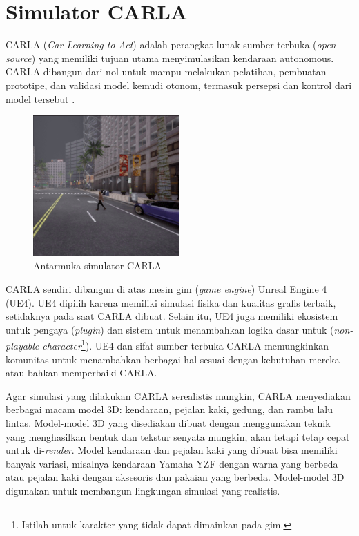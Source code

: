 \section{Simulator CARLA}

CARLA (\textit{Car Learning to Act}) adalah perangkat lunak sumber terbuka
(\textit{o\-pen sour\-ce}) yang memiliki tujuan utama menyimulasikan kendaraan
autonomous. CAR\-LA dibangun dari nol untuk mampu melakukan pelatihan, pembuatan
prototipe, dan validasi model kemudi otonom, termasuk persepsi dan kontrol dari
model tersebut \parencite{dos_carla}.

\begin{figure}[h!]
	\centering
	\includegraphics[width=0.5\textwidth]{resources/chapter-2/CARLA-cropped.png}
	\caption{Antarmuka simulator CARLA}
\end{figure}

CARLA sendiri dibangun di atas mesin gim (\textit{game engine}) Unreal Engine 4
(UE4). UE4 dipilih karena memiliki simulasi fisika dan kualitas grafis terbaik,
setidaknya pada saat CARLA dibuat. Selain itu, UE4 juga memiliki ekosistem untuk
pengaya (\textit{plugin}) dan sistem untuk menambahkan logika dasar untuk
(\textit{non-playable character}\footnote{Istilah untuk karakter yang tidak
	dapat dimainkan pada gim.}). UE4 dan sifat sumber terbuka CARLA memungkinkan
komunitas untuk menambahkan berbagai hal sesuai dengan kebutuhan mereka atau
bahkan memperbaiki CARLA.

Agar simulasi yang dilakukan CARLA serealistis mungkin, CARLA menyediakan
berbagai macam model 3D: kendaraan, pejalan kaki, gedung, dan rambu lalu lintas.
Model-model 3D yang disediakan dibuat dengan menggunakan teknik yang
menghasilkan bentuk dan tekstur senyata mungkin, akan tetapi tetap cepat untuk
di-\textit{render}. Model kendaraan dan pejalan kaki yang dibuat bisa memiliki
banyak variasi, misalnya kendaraan Yamaha YZF dengan warna yang berbeda atau
pejalan kaki dengan aksesoris dan pakaian yang berbeda. Model-model 3D
digunakan untuk membangun lingkungan simulasi yang realistis.

